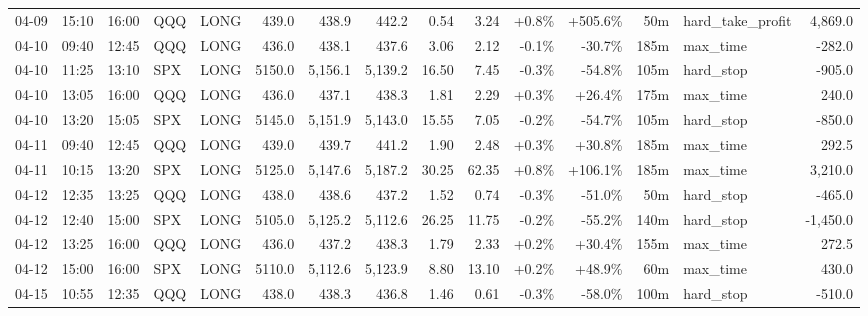 \documentclass[11pt,a4paper,twoside]{article}
\begin{document}
\begin{landscape}
\begin{center}
\begin{longtable}{>{\color{txtmain}}l l l l l r r r r r r r r >{\color{txtmain}}l r}
04-09 & 15:10 & 16:00 & QQQ & LONG & 439.0 & 438.9 & 442.2 & 0.54 & 3.24 & \textcolor{wingreen}{+0.8\%} & \textcolor{wingreen}{+505.6\%} & 50m & hard\_take\_profit & \textcolor{wingreen}{4,869.0} \\
04-10 & 09:40 & 12:45 & QQQ & LONG & 436.0 & 438.1 & 437.6 & 3.06 & 2.12 & \textcolor{lossred}{-0.1\%} & \textcolor{lossred}{-30.7\%} & 185m & max\_time & \textcolor{lossred}{-282.0} \\
04-10 & 11:25 & 13:10 & SPX & LONG & 5150.0 & 5,156.1 & 5,139.2 & 16.50 & 7.45 & \textcolor{lossred}{-0.3\%} & \textcolor{lossred}{-54.8\%} & 105m & hard\_stop & \textcolor{lossred}{-905.0} \\
04-10 & 13:05 & 16:00 & QQQ & LONG & 436.0 & 437.1 & 438.3 & 1.81 & 2.29 & \textcolor{wingreen}{+0.3\%} & \textcolor{wingreen}{+26.4\%} & 175m & max\_time & \textcolor{wingreen}{240.0} \\
04-10 & 13:20 & 15:05 & SPX & LONG & 5145.0 & 5,151.9 & 5,143.0 & 15.55 & 7.05 & \textcolor{lossred}{-0.2\%} & \textcolor{lossred}{-54.7\%} & 105m & hard\_stop & \textcolor{lossred}{-850.0} \\
04-11 & 09:40 & 12:45 & QQQ & LONG & 439.0 & 439.7 & 441.2 & 1.90 & 2.48 & \textcolor{wingreen}{+0.3\%} & \textcolor{wingreen}{+30.8\%} & 185m & max\_time & \textcolor{wingreen}{292.5} \\
04-11 & 10:15 & 13:20 & SPX & LONG & 5125.0 & 5,147.6 & 5,187.2 & 30.25 & 62.35 & \textcolor{wingreen}{+0.8\%} & \textcolor{wingreen}{+106.1\%} & 185m & max\_time & \textcolor{wingreen}{3,210.0} \\
04-12 & 12:35 & 13:25 & QQQ & LONG & 438.0 & 438.6 & 437.2 & 1.52 & 0.74 & \textcolor{lossred}{-0.3\%} & \textcolor{lossred}{-51.0\%} & 50m & hard\_stop & \textcolor{lossred}{-465.0} \\
04-12 & 12:40 & 15:00 & SPX & LONG & 5105.0 & 5,125.2 & 5,112.6 & 26.25 & 11.75 & \textcolor{lossred}{-0.2\%} & \textcolor{lossred}{-55.2\%} & 140m & hard\_stop & \textcolor{lossred}{-1,450.0} \\
04-12 & 13:25 & 16:00 & QQQ & LONG & 436.0 & 437.2 & 438.3 & 1.79 & 2.33 & \textcolor{wingreen}{+0.2\%} & \textcolor{wingreen}{+30.4\%} & 155m & max\_time & \textcolor{wingreen}{272.5} \\
04-12 & 15:00 & 16:00 & SPX & LONG & 5110.0 & 5,112.6 & 5,123.9 & 8.80 & 13.10 & \textcolor{wingreen}{+0.2\%} & \textcolor{wingreen}{+48.9\%} & 60m & max\_time & \textcolor{wingreen}{430.0} \\
04-15 & 10:55 & 12:35 & QQQ & LONG & 438.0 & 438.3 & 436.8 & 1.46 & 0.61 & \textcolor{lossred}{-0.3\%} & \textcolor{lossred}{-58.0\%} & 100m & hard\_stop & \textcolor{lossred}{-510.0} \\

\end{longtable}
\end{center}
\end{landscape}
\end{document}
